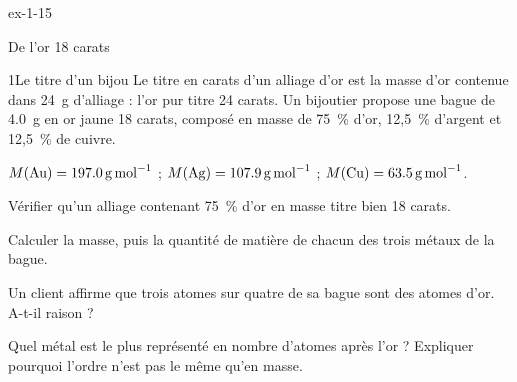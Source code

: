 \begin{blocLivre}{ex-1-15}
\begin{exercice}[3]{De l'or 18 carats}
\begin{docu}{1}{Le titre d'un bijou}
Le titre en carats d'un alliage d'or est la masse d'or contenue dans \qty{24}{g} d'alliage : l'or pur titre 24 carats. Un bijoutier
propose une bague de \qty{4,0}{g} en or jaune 18 carats, composé en masse de 75~\% d'or, 12,5~\% d'argent et 12,5~\% de cuivre.
\end{docu}
\begin{donnees}
$M(\ce{Au})=\qty{197,0}{g.mol^{-1}}$ ; $M(\ce{Ag})=\qty{107,9}{g.mol^{-1}}$ ; $M(\ce{Cu})=\qty{63,5}{g.mol^{-1}}$.
\end{donnees}
\begin{questions}
\item Vérifier qu'un alliage contenant 75~\% d'or en masse titre bien 18 carats.
\item Calculer la masse, puis la quantité de matière de chacun des trois métaux de la bague.
\item \initiative Un client affirme que trois atomes sur quatre de sa bague sont des atomes d'or. A-t-il raison ?
\item Quel métal est le plus représenté en nombre d'atomes après l'or ? Expliquer pourquoi l'ordre n'est pas le même
qu'en masse.
\end{questions}
\end{exercice}
\end{blocLivre}
